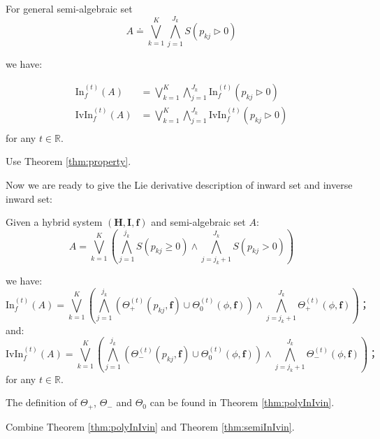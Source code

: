 \documentclass{article}
\begin{document}
For general semi-algebraic set
\begin{equation*}
	A \doteq \bigvee_{k=1}^K \bigwedge_{j=1}^{J_k} S(p_{kj} \rhd 0)
\end{equation*}

we have:
\begin{Theorem}
\label{thm:semiInIvin}
\begin{align*}
	\mathrm{In}^{(t)}_f(A) &= \bigvee_{k=1}^K \bigwedge_{j=1}^{J_k} \mathrm{In}^{(t)}_f(p_{kj} \rhd 0) \\
	\mathrm{IvIn}^{(t)}_f(A) &= \bigvee_{k=1}^K \bigwedge_{j=1}^{J_k} \mathrm{IvIn}^{(t)}_f(p_{kj} \rhd 0) \\
\end{align*}
for any $t \in \mathbb{R}$.
\end{Theorem}

\begin{Proof}
Use Theorem \ref{thm:property}.
\end{Proof}

Now we are ready to give the Lie derivative description of inward set and inverse inward set: 
\begin{Theorem}
\label{thm:semiLie}
Given a hybrid system $(\boldsymbol{H}, \boldsymbol{I},  \boldsymbol{f})$ and semi-algebraic set $A$: 
\begin{equation*}
	A  = \bigvee_{k=1}^K (\bigwedge_{j=1}^{j_k} S(p_{kj} \geq 0) \wedge \bigwedge_{j=j_k+1}^{J_{k}} S(p_{kj} > 0))
\end{equation*}

we have: 
\begin{equation*}
\mathrm{In}_f^{(t)}(A) = \bigvee_{k=1}^K (\bigwedge_{j=1}^{j_k} (\Theta_+^{(t)}(p_{kj}, \boldsymbol{f}) \cup \Theta_0^{(t)}(\phi, \boldsymbol{f})) \wedge \bigwedge_{j=j_k+1}^{J_k} \Theta_+^{(t)}(\phi, \boldsymbol{f}))；
\end{equation*}
and:
\begin{equation*}
\mathrm{IvIn}_f^{(t)}(A) = \bigvee_{k=1}^K (\bigwedge_{j=1}^{j_k} (\Theta_-^{(t)}(p_{kj}, \boldsymbol{f}) \cup \Theta_0^{(t)}(\phi, \boldsymbol{f})) \wedge \bigwedge_{j=j_k+1}^{J_k} \Theta_-^{(t)}(\phi, \boldsymbol{f}))；
\end{equation*}
for any $t \in \mathbb{R}$.

The definition of $\Theta_+$, $\Theta_-$ and $\Theta_0$ can be found in Theorem \ref{thm:polyInIvin}.
\end{Theorem}

\begin{Proof}
Combine Theorem \ref{thm:polyInIvin} and Theorem \ref{thm:semiInIvin}.
\end{Proof}
\end{document}
